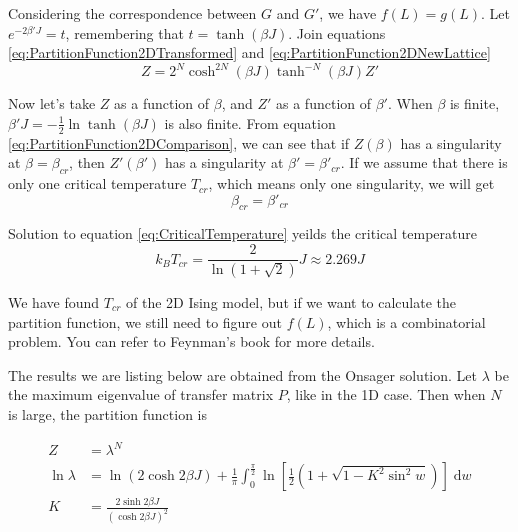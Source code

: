 \documentclass[11pt]{article}
\newcommand{\vd}{\mathrm{d}} %
\begin{document}
	Considering the correspondence between $G$ and $G'$, we have $f(L) = g(L)$.
	Let $e^{-2\beta' J} = t$, remembering that $t = \tanh(\beta J)$.
	Join equations \eqref{eq:PartitionFunction2DTransformed} and \eqref{eq:PartitionFunction2DNewLattice}
	\begin{equation} \label{eq:PartitionFunction2DComparison}
		Z = 2^N \cosh^{2N}(\beta J) \tanh^{-N}(\beta J) Z'
	\end{equation}

	Now let's take $Z$ as a function of $\beta$, and $Z'$ as a function of $\beta'$.
	When $\beta$ is finite, $\beta' J = -\frac12 \ln{\tanh(\beta J)}$ is also finite.
	From equation \eqref{eq:PartitionFunction2DComparison}, we can see that 
	if $Z(\beta)$ has a singularity at $\beta = \beta_{cr}$, 
	then $Z'(\beta')$ has a singularity at $\beta' = \beta'_{cr}$.
	If we assume that there is only one critical temperature $T_{cr}$, 
	which means only one singularity, we will get
	\begin{equation} \label{eq:Singularity}
		\beta_{cr} = \beta'_{cr}
	\end{equation}

	Solution to equation \eqref{eq:CriticalTemperature} yeilds the critical temperature
	\begin{equation} \label{eq:CriticalTemperature}
		k_B T_{cr} = \frac{2}{\ln(1+\sqrt{2})}J \approx 2.269J
	\end{equation}

	We have found $T_{cr}$ of the 2D Ising model, but if we want to calculate the partition function,
	we still need to figure out $f(L)$, which is a combinatorial problem.
	You can refer to Feynman's book\cite{feynman1972statistical} for more details.

	The results we are listing below are obtained from the Onsager solution\cite{onsager_solution}.
	Let $\lambda$ be the maximum eigenvalue of transfer matrix $P$, like in the 1D case.
	Then when $N$ is large, the partition function is

	\begin{equation}
		\begin{split}
			Z &= \lambda^N \\
			\ln{\lambda} &= \ln{\left(2 \cosh{2\beta J}\right)} + \frac{1}{\pi}\int_0^{\frac{\pi}{2}} \ln{\left[\frac{1}{2}\left(1 + \sqrt{1 - K^2\sin^2{w}}\right)\right]\;\vd w} \\
			K &= \frac{2\sinh{2\beta J}}{\left(\cosh{2\beta J}\right)^2}
		\end{split}
	\end{equation}
	
\end{document}
